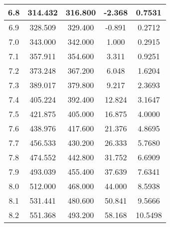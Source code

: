 \begin{table}[h!]
\begin{tabular}{|c|c|c|c|c|}
        6.8        & 314.432        & 316.800             & -2.368        & 0.7531                \\ \hline
        6.9        & 328.509        & 329.400             & -0.891        & 0.2712                \\ \hline
        7.0        & 343.000        & 342.000             & 1.000         & 0.2915                \\ \hline
        7.1        & 357.911        & 354.600             & 3.311         & 0.9251                \\ \hline
        7.2        & 373.248        & 367.200             & 6.048         & 1.6204                \\ \hline
        7.3        & 389.017        & 379.800             & 9.217         & 2.3693                \\ \hline
        7.4        & 405.224        & 392.400             & 12.824        & 3.1647                \\ \hline
        7.5        & 421.875        & 405.000             & 16.875        & 4.0000                \\ \hline
        7.6        & 438.976        & 417.600             & 21.376        & 4.8695                \\ \hline
        7.7        & 456.533        & 430.200             & 26.333        & 5.7680                \\ \hline
        7.8        & 474.552        & 442.800             & 31.752        & 6.6909                \\ \hline
        7.9        & 493.039        & 455.400             & 37.639        & 7.6341                \\ \hline
        8.0        & 512.000        & 468.000             & 44.000        & 8.5938                \\ \hline
        8.1        & 531.441        & 480.600             & 50.841        & 9.5666                \\ \hline
        8.2        & 551.368        & 493.200             & 58.168        & 10.5498               \\ \hline
    \end{tabular}\label{tab:table}
\end{table}

